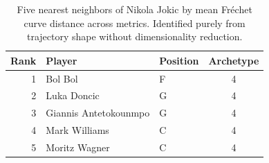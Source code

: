 \begin{table}[htbp]
  \centering\small
  \begin{tabular}{rllc}
    \toprule
    Rank & Player & Position & Archetype \\
    \midrule
    1 & Bol Bol & F & 4 \\
    2 & Luka Doncic & G & 4 \\
    3 & Giannis Antetokounmpo & G & 4 \\
    4 & Mark Williams & C & 4 \\
    5 & Moritz Wagner & C & 4 \\
    \bottomrule
  \end{tabular}
  \caption{Five nearest neighbors of Nikola Jokic by mean Fr\'{e}chet curve distance across metrics. Identified purely from trajectory shape without dimensionality reduction.}
  \label{tab:Nikola_Jokic_frechet_curve_neighbors}
\end{table}

